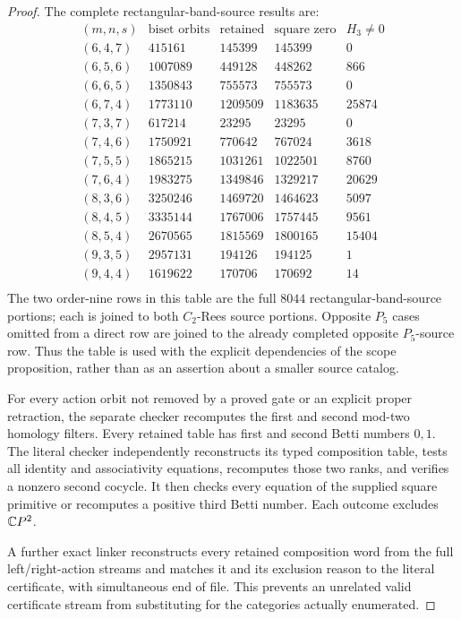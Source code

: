 \begin{proof}
The complete rectangular-band-source results are:
\[
\begin{array}{c|r|r|r|r}
(m,n,s)&\text{biset orbits}&\text{retained}&
\text{square zero}&H_3\ne0\\\hline
(6,4,7)&415161&145399&145399&0\\
(6,5,6)&1007089&449128&448262&866\\
(6,6,5)&1350843&755573&755573&0\\
(6,7,4)&1773110&1209509&1183635&25874\\
(7,3,7)&617214&23295&23295&0\\
(7,4,6)&1750921&770642&767024&3618\\
(7,5,5)&1865215&1031261&1022501&8760\\
(7,6,4)&1983275&1349846&1329217&20629\\
(8,3,6)&3250246&1469720&1464623&5097\\
(8,4,5)&3335144&1767006&1757445&9561\\
(8,5,4)&2670565&1815569&1800165&15404\\
(9,3,5)&2957131&194126&194125&1\\
(9,4,4)&1619622&170706&170692&14\\
\end{array}
\]
The two order-nine rows in this table are the full $8044$
rectangular-band-source portions; each is joined to both
$C_2$-Rees source portions. Opposite $P_5$ cases omitted
from a direct row are joined to the already completed
opposite $P_5$-source row. Thus the table is used with the
explicit dependencies of the scope proposition, rather
than as an assertion about a smaller source catalog.

For every action orbit not removed by a proved gate or
an explicit proper retraction, the separate checker
recomputes the first and second mod-two homology filters.
Every retained table has first and second Betti numbers
$0,1$. The literal checker independently reconstructs its
typed composition table, tests all identity and associativity
equations, recomputes those two ranks, and verifies a
nonzero second cocycle. It then checks every equation
of the supplied square primitive or recomputes a positive
third Betti number. Each outcome excludes $\mathbb{C}P^2$.

A further exact linker reconstructs every retained
composition word from the full left/right-action streams
and matches it and its exclusion reason to the literal
certificate, with simultaneous end of file. This prevents
an unrelated valid certificate stream from substituting
for the categories actually enumerated.


\end{proof}
